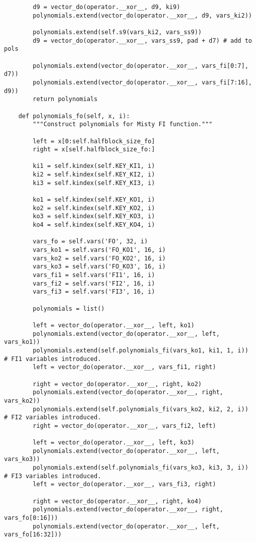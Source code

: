 \begin{lstlisting}
        d9 = vector_do(operator.__xor__, d9, ki9)
        polynomials.extend(vector_do(operator.__xor__, d9, vars_ki2))

        polynomials.extend(self.s9(vars_ki2, vars_ss9))
        d9 = vector_do(operator.__xor__, vars_ss9, pad + d7) # add to pols

        polynomials.extend(vector_do(operator.__xor__, vars_fi[0:7], d7))
        polynomials.extend(vector_do(operator.__xor__, vars_fi[7:16], d9))
        return polynomials

    def polynomials_fo(self, x, i):
        """Construct polynomials for Misty FI function."""

        left = x[0:self.halfblock_size_fo]
        right = x[self.halfblock_size_fo:]

        ki1 = self.kindex(self.KEY_KI1, i)
        ki2 = self.kindex(self.KEY_KI2, i)
        ki3 = self.kindex(self.KEY_KI3, i)

        ko1 = self.kindex(self.KEY_KO1, i)
        ko2 = self.kindex(self.KEY_KO2, i)
        ko3 = self.kindex(self.KEY_KO3, i)
        ko4 = self.kindex(self.KEY_KO4, i)

        vars_fo = self.vars('FO', 32, i)
        vars_ko1 = self.vars('FO_KO1', 16, i)
        vars_ko2 = self.vars('FO_KO2', 16, i)
        vars_ko3 = self.vars('FO_KO3', 16, i)
        vars_fi1 = self.vars('FI1', 16, i)
        vars_fi2 = self.vars('FI2', 16, i)
        vars_fi3 = self.vars('FI3', 16, i)

        polynomials = list()

        left = vector_do(operator.__xor__, left, ko1)
        polynomials.extend(vector_do(operator.__xor__, left, vars_ko1))
        polynomials.extend(self.polynomials_fi(vars_ko1, ki1, 1, i))  # FI1 variables introduced.
        left = vector_do(operator.__xor__, vars_fi1, right)

        right = vector_do(operator.__xor__, right, ko2)
        polynomials.extend(vector_do(operator.__xor__, right, vars_ko2))
        polynomials.extend(self.polynomials_fi(vars_ko2, ki2, 2, i))  # FI2 variables introduced.
        right = vector_do(operator.__xor__, vars_fi2, left)

        left = vector_do(operator.__xor__, left, ko3)
        polynomials.extend(vector_do(operator.__xor__, left, vars_ko3))
        polynomials.extend(self.polynomials_fi(vars_ko3, ki3, 3, i))  # FI3 variables introduced.
        left = vector_do(operator.__xor__, vars_fi3, right)

        right = vector_do(operator.__xor__, right, ko4)
        polynomials.extend(vector_do(operator.__xor__, right, vars_fo[0:16]))
        polynomials.extend(vector_do(operator.__xor__, left, vars_fo[16:32]))


\end{lstlisting}
